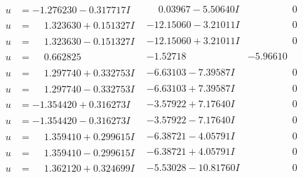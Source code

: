 \documentclass[1p]{elsarticle_modified}
\theoremstyle{definition}
\begin{document}
$$\begin{array}{c|c|c}
\begin{aligned}
u &= -1.276230 - 0.317717 I\end{aligned}
 & \phantom{-}0.03967 - 5.50640 I & \phantom{-0.000000 } 0 \\ \hline\begin{aligned}
u &= \phantom{-}1.323630 + 0.151327 I\end{aligned}
 & -12.15060 - 3.21011 I & \phantom{-0.000000 } 0 \\ \hline\begin{aligned}
u &= \phantom{-}1.323630 - 0.151327 I\end{aligned}
 & -12.15060 + 3.21011 I & \phantom{-0.000000 } 0 \\ \hline\begin{aligned}
u &= \phantom{-}0.662825\phantom{ +0.000000I}\end{aligned}
 & -1.52718\phantom{ +0.000000I} & -5.96610\phantom{ +0.000000I} \\ \hline\begin{aligned}
u &= \phantom{-}1.297740 + 0.332753 I\end{aligned}
 & -6.63103 - 7.39587 I & \phantom{-0.000000 } 0 \\ \hline\begin{aligned}
u &= \phantom{-}1.297740 - 0.332753 I\end{aligned}
 & -6.63103 + 7.39587 I & \phantom{-0.000000 } 0 \\ \hline\begin{aligned}
u &= -1.354420 + 0.316273 I\end{aligned}
 & -3.57922 + 7.17640 I & \phantom{-0.000000 } 0 \\ \hline\begin{aligned}
u &= -1.354420 - 0.316273 I\end{aligned}
 & -3.57922 - 7.17640 I & \phantom{-0.000000 } 0 \\ \hline\begin{aligned}
u &= \phantom{-}1.359410 + 0.299615 I\end{aligned}
 & -6.38721 - 4.05791 I & \phantom{-0.000000 } 0 \\ \hline\begin{aligned}
u &= \phantom{-}1.359410 - 0.299615 I\end{aligned}
 & -6.38721 + 4.05791 I & \phantom{-0.000000 } 0 \\ \hline\begin{aligned}
u &= \phantom{-}1.362120 + 0.324699 I\end{aligned}
 & -5.53028 - 10.81760 I & \phantom{-0.000000 } 0 \\ \hline\begin{aligned}

\end{aligned}
\end{array}$$
\end{document}
